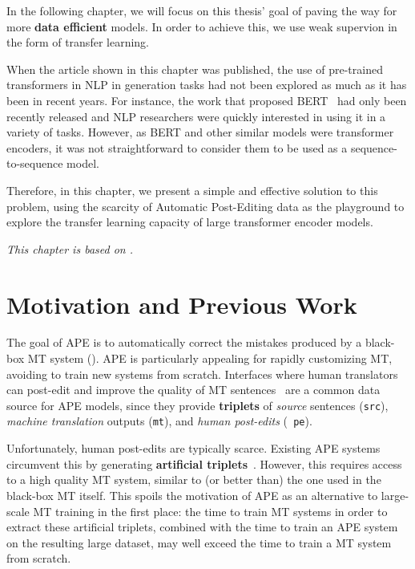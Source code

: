 \label{cap:ape}

In the following chapter, we will focus on this thesis' goal of
paving the way for more \textbf{data efficient} models. In order to
achieve this, we use weak supervion in the form of transfer learning.

When the article shown in this chapter was published, the use of
pre-trained transformers %
in NLP in generation tasks had not been explored as much as it has
been in recent years. %
For instance, the work that proposed
BERT~\citep{devlin2018bert} had only been recently released and NLP
researchers were quickly interested in using it in a variety of
tasks. However, as BERT and other similar models were transformer
encoders, it was not straightforward to consider them to be used
as a sequence-to-sequence model. %

Therefore, in this chapter, we present a simple and effective
solution to this problem, using the scarcity of Automatic Post-Editing
data as the playground to explore the transfer learning capacity of
large transformer encoder models.

\emph{This chapter is based on \citet{Correia2019}.}

\section{Motivation and Previous Work}

The goal of APE is to automatically correct the mistakes produced by
a black-box MT system (). APE is particularly
appealing for rapidly customizing MT, avoiding to train new systems
from scratch. Interfaces where human translators can post-edit and
improve the quality of MT
sentences~\citep{Alabau2014,Federico2014,Denkowski2015,Hokamp2018}
are a common data source for APE models, since they provide {\bf
    triplets} of {\it source} sentences ({\tt src}), {\it machine
    translation} outputs ({\tt mt}), and {\it human post-edits} ({\tt
    pe}).

Unfortunately, human post-edits are typically scarce. Existing APE
systems circumvent this by generating {\bf artificial
    triplets}~\citep{junczys2016log, negri2018escape}. However, this
requires access to a high quality MT system, similar to (or better
than) the one used in the black-box MT itself. This spoils the
motivation of APE as an alternative to large-scale MT training in the
first place: the time to train MT systems in order to extract these
artificial triplets, combined with the time to train an APE system on
the resulting large dataset, may well exceed the time to train a MT
system from scratch.

